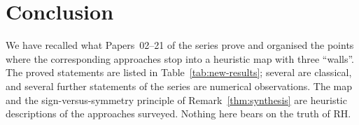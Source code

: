 \documentclass[11pt]{amsart}
\theoremstyle{definition}
\theoremstyle{remark}
\begin{document}
\section{Conclusion}
\label{sec:conclusion}

We have recalled what Papers~02--21 of the series prove and organised the points where the
corresponding approaches stop into a heuristic map with three ``walls''. The proved
statements are listed in Table~\ref{tab:new-results}; several are classical, and several
further statements of the series are numerical observations. The map and the
sign-versus-symmetry principle of Remark~\ref{thm:synthesis} are heuristic descriptions of
the approaches surveyed. Nothing here bears on the truth of RH.
\end{document}
